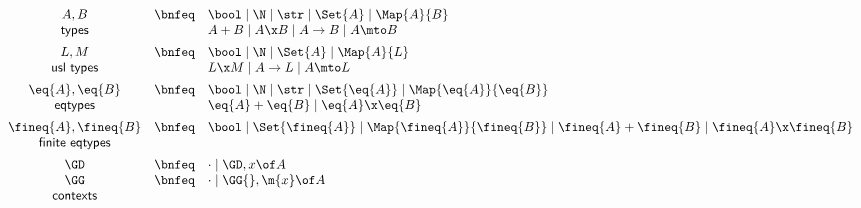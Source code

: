 \documentclass[preprint]{sigplanconf}
\renewcommand{\pipe}{\mathrel{\mid}} %
\newcommand{\uto}{\to}
\begin{document}



\begin{figure}
  \[\begin{array}{ccl}
    A, B     &\bnfeq& \bool \pipe \N \pipe \str \pipe \Set{A}
                      \pipe \Map{A}{B}
    \\
    \textsf{types} && A + B \pipe A \x B \pipe A \uto B \pipe A \mto B
    \vspace{0.5em}\\
    L, M         &\bnfeq& \bool \pipe \N \pipe \Set{A} \pipe \Map{A}{L}
    \\
    \textsf{usl types} && L \x M \pipe A \uto L \pipe A \mto L
    \vspace{0.5em}\\
    \eq{A}, \eq{B} &\bnfeq& \bool \pipe \N \pipe \str \pipe \Set{\eq{A}}
                            \pipe \Map{\eq{A}}{\eq{B}}
    \\
    \textsf{eqtypes} && \eq{A} + \eq{B} \pipe \eq{A} \x \eq{B}
    \vspace{0.5em}\\
    \fineq{A},\fineq{B}
    &\bnfeq& \bool \pipe \Set{\fineq{A}}
       \pipe \Map{\fineq{A}}{\fineq{B}}
       \pipe \fineq{A} + \fineq{B} \pipe \fineq{A} \x \fineq{B}\\
    \textsf{finite eqtypes}
    \vspace{0.5em}\\
    \GD &\bnfeq& \cdot \pipe \GD, x\of A\\
    \GG &\bnfeq& \cdot \pipe \GG{}, \m{x}\of A\\
    \textsf{contexts}
    \vspace{0.3em}\\

\end{array}\]
\end{figure}
\end{document}
